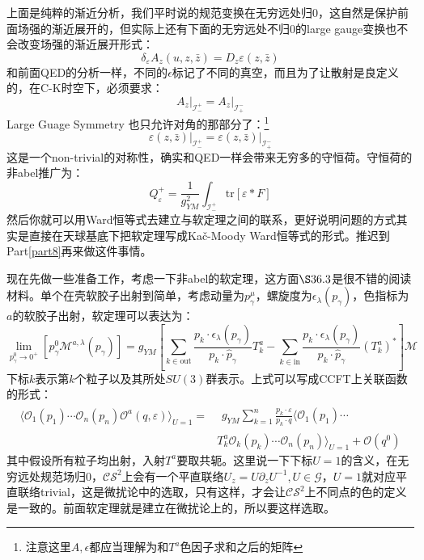 上面是纯粹的渐近分析，我们平时说的规范变换在无穷远处归0，这自然是保护前面场强的渐近展开的，但实际上还有下面的无穷远处不归0的large gauge变换也不会改变场强的渐近展开形式：
\begin{equation}
	\delta_\varepsilon A_z(u,z,\bar{z})=D_z\varepsilon(z,\bar{z})
\end{equation}
和前面QED的分析一样，不同的$\epsilon$标记了不同的真空，而且为了让散射是良定义的，在C-K时空下，必须要求：
\begin{equation}
	\left.A_z\right|_{\mathcal{I}_-^+}=\left.A_z\right|_{\mathcal{I}_+^-}
\end{equation}
Large Guage Symmetry 也只允许对角的那部分了：\footnote{注意这里$A,\epsilon$都应当理解为和$T^a$色因子求和之后的矩阵}
\begin{equation}
	\left.\varepsilon(z,\bar{z})\right|_{\mathcal{I}_-^+}=\left.\varepsilon(z,\bar{z})\right|_{\mathcal{I}_+^-}
\end{equation}
这是一个non-trivial的对称性，确实和QED一样会带来无穷多的守恒荷。守恒荷的非abel推广为：
\begin{equation}
	Q_\varepsilon^+=\frac1{g_{YM}^2}\int_{\mathcal{I}_-^+}\mathrm{tr}\left[\varepsilon*F\right]
\end{equation}
然后你就可以用Ward恒等式去建立与软定理之间的联系，更好说明问题的方式其实是直接在天球基底下把软定理写成Ka\v{c}\mbox{-}Moody Ward恒等式的形式。推迟到Part\ref{part8}再来做这件事情。

现在先做一些准备工作，考虑一下非abel的软定理，这方面\cite{Schwartz:2014sze}$\S 36.3$是很不错的阅读材料。单个在壳软胶子出射到简单，考虑动量为$p_\gamma^\mu$，螺旋度为$\epsilon_\lambda(p_\gamma)$，色指标为$a$的软胶子出射，软定理可以表达为：
\begin{equation}
	\lim_{p_{\gamma}^{0}\to0^{+}}\left[p_{\gamma}^{0}\mathcal{M}^{a,\lambda}(p_{\gamma})\right]=g_{YM}\left[\sum_{k\in\text{out}}\frac{p_{k}\cdot\epsilon_{\lambda}(p_{\gamma})}{p_{k}\cdot\hat{p}_{\gamma}}T_{k}^{a}-\sum_{k\in\text{in}}\frac{p_{k}\cdot\epsilon_{\lambda}(p_{\gamma})}{p_{k}\cdot\hat{p}_{\gamma}}\left(T_{k}^{a}\right)^{*}\right]\mathcal{M}
\end{equation}
下标$k$表示第$k$个粒子以及其所处$SU(3)$群表示。上式可以写成CCFT上关联函数的形式：
\begin{equation}\label{eq:28.24}
	\begin{aligned}
		\langle\mathcal{O}_{1}(p_{1})\cdots\mathcal{O}_{n}(p_{n})\mathcal{O}^{a}(q,\varepsilon)\rangle_{U=1}=& \begin{aligned}g_{YM}\sum_{k=1}^{n}\frac{p_{k}\cdot\varepsilon}{p_{k}\cdot q}\langle\mathcal{O}_{1}(p_{1})\cdots \end{aligned}  \\
		&T_k^a\mathcal{O}_k(p_k)\cdots\mathcal{O}_n(p_n)\rangle_{U=1}+\mathcal{O}(q^0)
	\end{aligned}
\end{equation}
其中假设所有粒子均出射，入射$T^a$要取共轭。这里说一下下标$U=1$的含义，在无穷远处规范场归0，$\mathcal{CS}^2$上会有一个平直联络$U_z=U\partial_z U^{-1},U\in\mathcal{G}$，$U=1$就对应平直联络trivial，这是微扰论中的选取，只有这样，才会让$\mathcal{CS}^2$上不同点的色的定义是一致的。前面软定理就是建立在微扰论上的，所以要这样选取。

